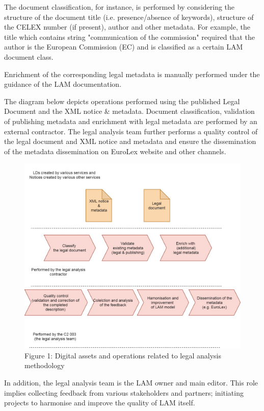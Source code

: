 The document classification, for instance, is performed by considering
the structure of the document title (i.e. presence/absence of keywords),
structure of the CELEX number (if present), author and other metadata.
For example, the title which contains string "communication of the
commission" required that the author is the European Commission (EC) and
is classified as a certain LAM document class.

Enrichment of the corresponding legal metadata is manually performed
under the guidance of the LAM documentation.

The diagram below depicts operations performed using the published Legal
Document and the XML notice \& metadata. Document classification,
validation of publishing metadata and enrichment with legal metadata are
performed by an external contractor. The legal analysis team further
performs a quality control of the legal document and XML notice and
metadata and ensure the dissemination of the metadata dissemination on
EuroLex website and other channels.

\begin{figure}
\centering
\includegraphics[width=5in,height=\textheight]{../../docs/LAM context.jpg}
\caption{{Figure{ 1}: }Digital assets and operations related to legal
analysis methodology}
\end{figure}

In addition, the legal analysis team is the LAM owner and main editor.
This role implies collecting feedback from various stakeholders and
partners; initiating projects to harmonise and improve the quality of
LAM itself.
